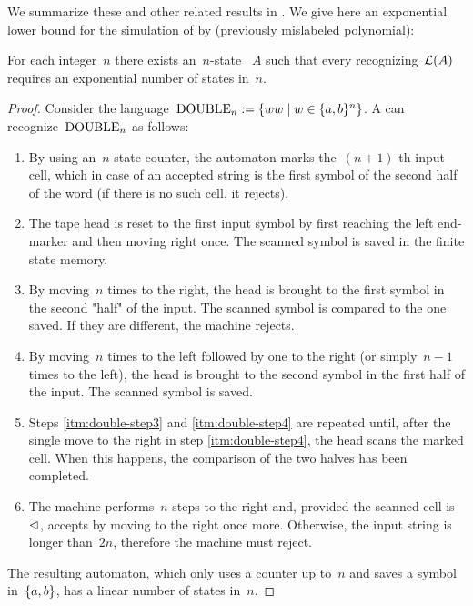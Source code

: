 We summarize these and other related results in .
We give here an exponential lower bound for the simulation of \OMODLAs by \ONFAs (previously mislabeled polynomial):
\begin{thrm}\label{thm:OM1DLAto1NFAlower}
	For each integer~$n$ there exists an~$n$-state \OMODLA~$A$ such that every \ONFA recognizing~$\mathcal L(A)$ requires an exponential number of states in~$n$.
\end{thrm}
\begin{proof}
	Consider the language~$\mathrm{DOUBLE}_n:=\{ww\mid w\in\{a,b\}^n\}$.
	A \OMODLA can recognize~$\mathrm{DOUBLE}_n$ as follows:
	\begin{enumerate}
		\item By using an~$n$-state counter, the automaton marks the~$(n+1)$-th input cell, which in case of an accepted string is the first symbol of the second half of the word (if there is no such cell, it rejects).
		\item The tape head is reset to the first input symbol by first reaching the left end-marker and then moving right once. The scanned symbol is saved in the finite state memory.
		\item\label{itm:double-step3} By moving~$n$ times to the right, the head is brought to the first symbol in the second "half" of the input. The scanned symbol is compared to the one saved.
		      If they are different, the machine rejects.
		\item\label{itm:double-step4} By moving~$n$ times to the left followed by one to the right (or simply~$n-1$ times to the left), the head is brought to the second symbol in the first half of the input. The scanned symbol is saved.
		\item Steps \ref{itm:double-step3} and \ref{itm:double-step4} are repeated until, after the single move to the right in step \ref{itm:double-step4}, the head scans the marked cell. When this happens, the comparison of the two halves has been completed.
		\item The machine performs~$n$ steps to the right and, provided the scanned cell is~$\lhd$, accepts by moving to the right once more.
		      Otherwise, the input string is longer than~$2n$, therefore the machine must reject.
	\end{enumerate}
	The resulting automaton, which only uses a counter up to~$n$ and saves a symbol in~$\{a,b\}$, has a linear number of states in~$n$.


\end{proof}
